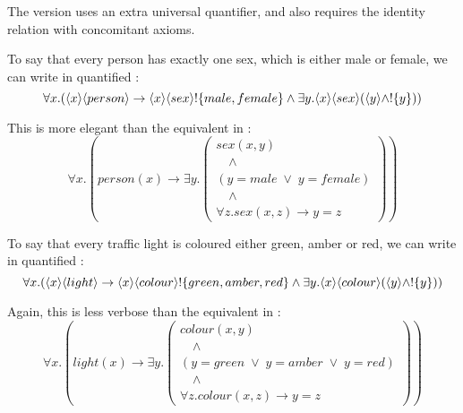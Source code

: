 \NI The \fol{} version uses an extra universal quantifier, and also
requires the identity relation with concomitant axioms.

To say that every person has exactly one sex, which is either male or
female, we can write in quantified \cathoristic{}:
\[
   \forall x . 
      ( \langle x \rangle \langle person \rangle \rightarrow \langle x \rangle \langle sex \rangle !\{male, female\} 
      \land 
      \exists y . \langle x \rangle \langle sex \rangle (\langle y \rangle \land
   ! \{y\}) )
\]

\NI This is more elegant than the equivalent in \fol{}:
\[
   \forall x. ( person(x) \rightarrow \exists y .
   \left(
      \begin{array}{l}
        sex(x,y) \\
        \quad\land\\
        (y = male \; \lor \; y = female)\\ 
        \quad\land\\
        \forall z . sex(x,z) \rightarrow    y = z 
      \end{array}
   \right))
\]

\NI To say that every traffic light is coloured either green, amber or
red, we can write in quantified \cathoristic{}:
\[
   \forall x. (\langle x \rangle \langle light \rangle \rightarrow \langle x \rangle \langle colour \rangle !\{green, amber, red\} \land \exists y . \langle x \rangle \langle colour \rangle (\langle y \rangle \land !\{y\}))
\]

\NI Again, this is less verbose than the equivalent in
\fol{}:
\[
   \forall x. ( light(x) \rightarrow \exists y .
   \left(
      \begin{array}{l}
        colour(x,y) \\
        \quad\land\\
        (y = green \; \lor \; y = amber \; \lor \; y = red) \\
        \quad\land \\
        \forall z . colour(x,z) \rightarrow y = z
      \end{array}
   \right)  )
\]

